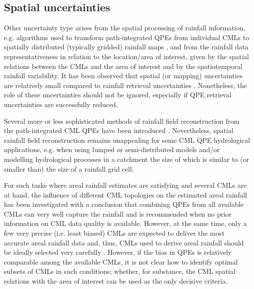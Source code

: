 \documentclass{ctuthesis}\usepackage[]{graphicx}\usepackage[]{color}
\begin{document}
\subsection{Spatial uncertainties}

Other uncertainty type arises from the spatial processing of rainfall information, e.g. algorithms used to transform path-integrated QPEs from individual CMLs to spatially distributed (typically gridded) rainfall maps \citep[e.g.][]{overeemCountrywideRainfallMaps2013, riosgaonaRainfallRetrievalCommercial2018}, and from the rainfall data representativeness in relation to the location/area of interest, given by the spatial relations between the CMLs and the area of interest and by the spatiotemporal rainfall variability. It has been observed that spatial (or mapping) uncertainties are relatively small compared to rainfall retrieval uncertainties \citep{riosgaonaMeasurementInterpolationUncertainties2015}. Nonetheless, the role of these uncertainties should not be ignored, especially if QPE retrieval uncertainties are successfully reduced.

 
Several more or less sophisticated methods of rainfall field reconstruction from the path-integrated CML QPEs have been introduced \citep[e.g.][]{goldshteinRainRateEstimation2009, damicoUseOperationalMicrowave2016, haeseStochasticReconstructionInterpolation2017}. Nevertheless, spatial rainfall field reconstruction  remains unappealing for some CML QPE hydrological applications, e.g. when using lumped or semi-distributed models and/or modelling hydrological processes in a catchment the size of which is similar to (or smaller than) the size of a rainfall grid cell. 

For such tasks where areal rainfall estimates are satisfying and several CMLs are at hand, the influence of different CML topologies on the estimated areal rainfall has been investigated \citep{fenclCommercialMicrowaveLinks2015} with a conclusion that combining QPEs from all available CMLs can very well capture the rainfall and is recommended when no prior information on CML data quality is available. However, at the same time, only a few very precise (i.e. least biased) CMLs are expected to deliver the most accurate areal rainfall data and, thus, CMLs used to derive areal rainfall should be ideally selected very carefully \citep{fenclCommercialMicrowaveLinks2015}. However, if the bias in QPEs is relatively comparable among the available CMLs, it is not clear how to identify optimal subsets of CMLs in such conditions; whether, for substance, the CML spatial relations with the area of interest can be used as the only decisive criteria.
\end{document}
